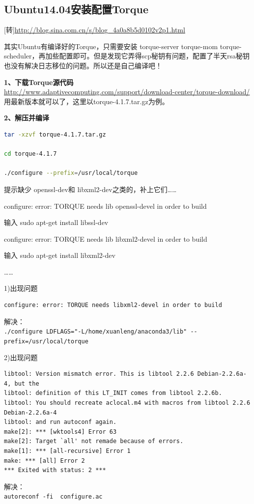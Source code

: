 {\subsection{Ubuntu14.04安装配置Torque}
[转]\url{http://blog.sina.com.cn/s/blog_4a0a8b5d0102v2p1.html}

其实Ubuntu有编译好的Torque，只需要安装 torque-server torque-mom torque-scheduler，再加些配置即可。但是发现它弄得scp秘钥有问题，配置了半天rsa秘钥也没有解决日志移位的问题。所以还是自己编译吧！

\textbf{1、下载Torque源代码}\\
\url{http://www.adaptivecomputing.com/support/download-center/torque-download/}\\
用最新版本就可以了，这里以torque-4.1.7.tar.gz为例。

\textbf{2、解压并编译}

\begin{lstlisting}[language=sh]
tar -xzvf torque-4.1.7.tar.gz

cd torque-4.1.7

./configure --prefix=/usr/local/torque
\end{lstlisting}

提示缺少 openssl-dev和 libxml2-dev之类的，补上它们……

configure: error: TORQUE needs lib openssl-devel in order to build

输入 sudo apt-get install libssl-dev

configure: error: TORQUE needs lib libxml2-devel in order to build

输入 sudo apt-get install libxml2-dev

……

1)出现问题
\begin{verbatim}
configure: error: TORQUE needs libxml2-devel in order to build
\end{verbatim}

解决：\\
\verb|./configure LDFLAGS="-L/home/xuanleng/anaconda3/lib" --prefix=/usr/local/torque|

2)出现问题
\begin{verbatim}
libtool: Version mismatch error. This is libtool 2.2.6 Debian-2.2.6a-4, but the
libtool: definition of this LT_INIT comes from libtool 2.2.6b.
libtool: You should recreate aclocal.m4 with macros from libtool 2.2.6 Debian-2.2.6a-4
libtool: and run autoconf again.
make[2]: *** [wktools4] Error 63
make[2]: Target `all' not remade because of errors.
make[1]: *** [all-recursive] Error 1
make: *** [all] Error 2
*** Exited with status: 2 ***
\end{verbatim}
解决：\\
\verb|autoreconf -fi  configure.ac |



}
